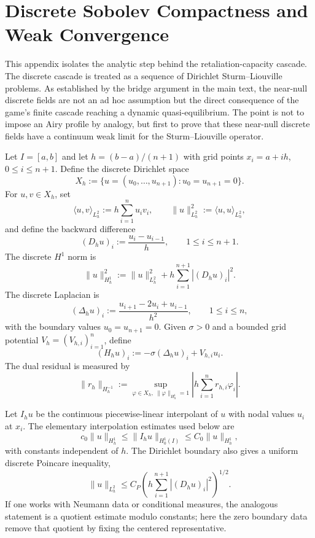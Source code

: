
\section{Discrete Sobolev Compactness and Weak Convergence}
\label{app:discrete-cascade-compactness}

This appendix isolates the analytic step behind the retaliation-capacity
cascade.  The discrete cascade is treated as a sequence of Dirichlet
Sturm--Liouville problems.  As established by the bridge argument in the main text, the near-null discrete fields are not an ad hoc assumption but the direct consequence of the game's finite cascade reaching a dynamic quasi-equilibrium. The point is not to impose an Airy profile by
analogy, but first to prove that these near-null discrete fields have a continuum
weak limit for the Sturm--Liouville operator.

Let $I=[a,b]$ and let $h=(b-a)/(n+1)$ with grid points
$x_i=a+ih$, $0\le i\le n+1$.  Define the discrete Dirichlet space
\[
  X_h
  :=
  \{u=(u_0,\ldots,u_{n+1}) : u_0=u_{n+1}=0\}.
\]
For $u,v\in X_h$, set
\[
  \langle u,v\rangle_{L_h^2}
  :=
  h\sum_{i=1}^n u_i v_i,
  \qquad
  \|u\|_{L_h^2}^2
  :=
  \langle u,u\rangle_{L_h^2},
\]
and define the backward difference
\[
  (D_hu)_i := \frac{u_i-u_{i-1}}{h},
  \qquad 1\le i\le n+1.
\]
The discrete $H^1$ norm is
\[
  \|u\|_{H_h^1}^2
  :=
  \|u\|_{L_h^2}^2
  +
  h\sum_{i=1}^{n+1}|(D_hu)_i|^2 .
\]
The discrete Laplacian is
\[
  (\Delta_hu)_i
  :=
  \frac{u_{i+1}-2u_i+u_{i-1}}{h^2},
  \qquad 1\le i\le n,
\]
with the boundary values $u_0=u_{n+1}=0$.  Given $\sigma>0$ and a bounded
grid potential $V_h=(V_{h,i})_{i=1}^n$, define
\[
  (H_hu)_i := -\sigma(\Delta_hu)_i+V_{h,i}u_i.
\]
The dual residual is measured by
\[
  \|r_h\|_{H_h^{-1}}
  :=
  \sup_{\varphi\in X_h,\ \|\varphi\|_{H_h^1}=1}
  \left|
    h\sum_{i=1}^n r_{h,i}\varphi_i
  \right|.
\]

Let $I_hu$ be the continuous piecewise-linear interpolant of $u$ with nodal
values $u_i$ at $x_i$.  The elementary interpolation estimates used below are
\[
  c_0\|u\|_{H_h^1}
  \le
  \|I_hu\|_{H_0^1(I)}
  \le
  C_0\|u\|_{H_h^1},
  \tag{A.1}
\]
with constants independent of $h$.  The Dirichlet boundary also gives a
uniform discrete Poincare inequality,
\[
  \|u\|_{L_h^2}
  \le
  C_P
  \left(h\sum_{i=1}^{n+1}|(D_hu)_i|^2\right)^{1/2}.
  \tag{A.2}
\]
If one works with Neumann data or conditional measures, the analogous statement
is a quotient estimate modulo constants; here the zero boundary data remove
that quotient by fixing the centered representative.

